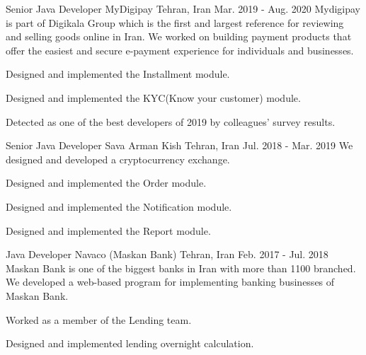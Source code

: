\begin{cventries}
  \cventry
    {Senior Java Developer} %
    {MyDigipay} %
    {Tehran, Iran} %
    {Mar. 2019 - Aug. 2020} %
    {
      Mydigipay is part of Digikala Group which is the first and largest reference for reviewing and selling goods online in Iran.
      We worked on building payment products that offer the easiest and secure e-payment experience for individuals and businesses.
    }
    {
      \begin{cvitems} %
        \item {Designed and implemented the Installment module.}
        \item {Designed and implemented the KYC(Know your customer) module.}
        \item {Detected as one of the best developers of 2019 by colleagues' survey results.}
      \end{cvitems}
    }

  \cventry
    {Senior Java Developer} %
    {Sava Arman Kish} %
    {Tehran, Iran} %
    {Jul. 2018 - Mar. 2019} %
    {
      We designed and developed a cryptocurrency exchange.
    }
    {
      \begin{cvitems} %
        \item {Designed and implemented the Order module.}
        \item {Designed and implemented the Notification module.}
        \item {Designed and implemented the Report module.}
      \end{cvitems}
    }

  \cventry
    {Java Developer} %
    {Navaco (Maskan Bank)} %
    {Tehran, Iran} %
    {Feb. 2017 - Jul. 2018} %
    {
      Maskan Bank is one of the biggest banks in Iran with more than 1100 branched.
      We developed a web-based program for implementing banking businesses of Maskan Bank.
    }
    {
      \begin{cvitems} %
        \item {Worked as a member of the Lending team.}
        \item {Designed and implemented lending overnight calculation.}
      \end{cvitems}
    }


\end{cventries}
